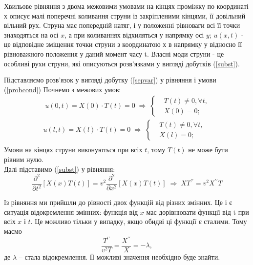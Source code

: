 \documentclass[a4paper, 14pt]{extreport}
\begin{document}
Хвильове рівняння з двома межовими умовами на кінцях проміжку по координаті х описує малі поперечні коливання струни із закріпленими кінцями, її довільний вільний рух. Струна має попередній натяг, і у положенні рівноваги  всі її точки знаходяться на осі $x$, а при коливаннях відхиляться у напрямку осі $y$; $u(x,t)$ - це відповідне зміщення точки струни з координатою х в напрямку у відносно її рівноважного положення у даний момент часу t. Власні моди струни - це особливі рухи струни, які описуються розв'язками у вигляді добутків (\ref{subst}). 

Підставляємо розв'язок у вигляді добутку (\ref{sepvar})  у рівняння і умови (\ref{probcond}) Почнемо з межових умов:
\begin{equation*}
    \begin{aligned}
        \;u(0,t) = X(0) \cdot T(t) = 0
        \;\Rightarrow\;
        \left\{ \begin{aligned}
            &T(t) \neq 0, \forall t, \\  &X(0) = 0; 
        \end{aligned} \right.\\
        u(l,t) = X(l) \cdot T(t) = 0
        \;\Rightarrow\;
        \left\{ \begin{aligned}
            &T(t) \neq 0, \forall t, \\  &X(l) = 0; 
        \end{aligned} \right.\\
    \end{aligned}
\end{equation*}
Умови на кінцях струни виконуються при всіх $t$, тому $T(t)$ не може бути рівним нулю.\\
Далі підставимо (\ref{subst}) у рівняння:
\begin{equation*}
    \frac{\partial^2}{\partial t^2}\left[X(x)T(t)\right] = v^2 \frac{\partial^2}{\partial x^2}\left[X(x)T(t)\right]
    \;\Rightarrow\; 
    X T^{\prime\prime} = v^2 X^{\prime\prime} T 
\end{equation*}

Із рівняння ми прийшли до рівності двох функцій від різних змінних. Це і є ситуація відокремлення змінних: функція від $x$ має дорівнювати функції від t при всіх $x$ і $t$. Це можливо тільки у випадку, якщо обидві ці функції є сталими. Тому маємо
\begin{equation} \label{managedvar}
    \frac{T^{\prime\prime}}{v^2T} = \frac{X^{\prime\prime}}{X} = - \lambda,
\end{equation}
де $\lambda$ -- стала відокремлення. ЇЇ можливі значення необхідно буде знайти.
\end{document}
